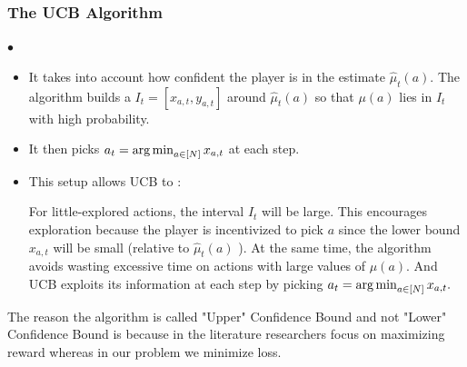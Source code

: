 \documentclass{article}
\begin{document}
\subsubsection{The UCB Algorithm}
$\bullet$ 
\begin{itemize}
    \item It takes into account how confident the player is in the estimate $\hat{\mu}_{t}(a)$. The algorithm builds a  $I_{t}=\left[x_{a, t}, y_{a, t}\right]$ around $\hat{\mu}_{t}(a)$ so that $\mu(a)$ lies in $I_{t}$ with high probability. 
    \item It then picks $a_{t}=\operatorname*{arg\,min}_{a \in[N]} x_{a, t}$ at each step. 
    \item This setup allows UCB to :

 For little-explored actions, the interval $I_{t}$ will be large. This encourages exploration because the player is incentivized to pick $a$ since the lower bound $x_{a, t}$ will be small (relative to $\hat{\mu}_{t}(a)$ ). At the same time, the algorithm avoids wasting excessive time on actions with large values of $\mu(a)$. And UCB exploits its information at each step by picking $a_{t}=\operatorname*{arg\,min}_{a \in[N]} x_{a, t} .$
\end{itemize}
\begin{rema}
  The reason the algorithm is called "Upper" Confidence Bound and not "Lower" Confidence Bound is because in the literature researchers focus on maximizing reward whereas in our problem we minimize loss.
\end{rema}
\end{document}
